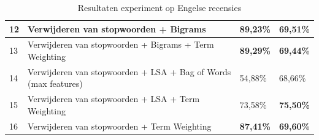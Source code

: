 \begin{table}[h]
\begin{adjustbox}{width=1\textwidth}
\begin{tabular}{|l|l|l|l|}
12       & Verwijderen van stopwoorden + Bigrams                                    & {\bf 89,23\%}                           & {\bf 69,51\%}                  \\ \hline
13       & Verwijderen van stopwoorden + Bigrams + Term Weighting                   & {\bf 89,29\%}                           & {\bf 69,44\%}                  \\ \hline
14       & Verwijderen van stopwoorden + LSA + Bag of Words (max features)                    & 54,88\%                                 & 68,66\%                        \\ \hline
15       & Verwijderen van stopwoorden + LSA + Term Weighting                          & 73,58\%                                 & {\bf 75,50\%}                  \\ \hline
16       & Verwijderen van stopwoorden + Term Weighting                                        & {\bf 87,41\%}                           & {\bf 69,60\%}                  \\ \hline
\end{tabular}
\end{adjustbox}

\caption{Resultaten experiment op Engelse recensies}
\label{tabel: resultaten engelse gevoelsanalyse}
\end{table}


